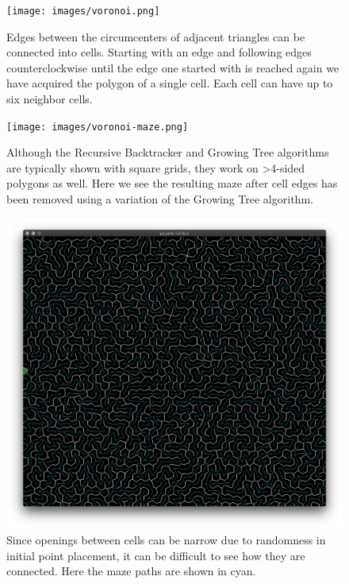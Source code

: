 \documentclass[a4paper,12pt]{article}
\begin{document}
\begin{figure}[ht]
  \centering
  \texttt{[image: images/voronoi.png]}
  \caption{Edges between the circumcenters of adjacent triangles can be
    connected into cells. Starting with an edge and following edges
    counterclockwise until the edge one started with is reached
    again we have acquired the polygon of a single cell. Each
    cell can have up to six neighbor cells.
  \label{fig:voronoi}}
\end{figure}

\begin{figure}[ht]
  \centering
  \texttt{[image: images/voronoi-maze.png]}
  \caption{Although the Recursive Backtracker and Growing Tree algorithms are
    typically shown with square grids, they work on >4-sided polygons as well.
    Here we see the resulting maze after cell edges has been removed using a
    variation of the Growing Tree algorithm.
  \label{fig:maze}}
\end{figure}

\begin{figure}[ht]
  \centering
  \includegraphics[width=\linewidth]{images/voronoi-maze-connections.png}
  \caption{Since openings between cells can be narrow due to randomness in
    initial point placement, it can be difficult to see how they are connected.
    Here the maze paths are shown in cyan.
  \label{fig:maze-connections}}
\end{figure}
\end{document}
